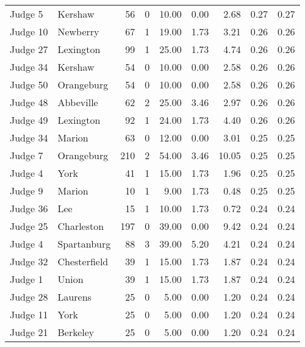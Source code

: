 \begin{tabular}{llrrrrrrr}
 Judge 5 &      Kershaw &    56 &      0 & 10.00 &       0.00 &      2.68 &         0.27 &      0.27 \\
Judge 10 &     Newberry &    67 &      1 & 19.00 &       1.73 &      3.21 &         0.26 &      0.26 \\
Judge 27 &    Lexington &    99 &      1 & 25.00 &       1.73 &      4.74 &         0.26 &      0.26 \\
Judge 34 &      Kershaw &    54 &      0 & 10.00 &       0.00 &      2.58 &         0.26 &      0.26 \\
Judge 50 &   Orangeburg &    54 &      0 & 10.00 &       0.00 &      2.58 &         0.26 &      0.26 \\
Judge 48 &    Abbeville &    62 &      2 & 25.00 &       3.46 &      2.97 &         0.26 &      0.26 \\
Judge 49 &    Lexington &    92 &      1 & 24.00 &       1.73 &      4.40 &         0.26 &      0.26 \\
Judge 34 &       Marion &    63 &      0 & 12.00 &       0.00 &      3.01 &         0.25 &      0.25 \\
 Judge 7 &   Orangeburg &   210 &      2 & 54.00 &       3.46 &     10.05 &         0.25 &      0.25 \\
 Judge 4 &         York &    41 &      1 & 15.00 &       1.73 &      1.96 &         0.25 &      0.25 \\
 Judge 9 &       Marion &    10 &      1 &  9.00 &       1.73 &      0.48 &         0.25 &      0.25 \\
Judge 36 &          Lee &    15 &      1 & 10.00 &       1.73 &      0.72 &         0.24 &      0.24 \\
Judge 25 &   Charleston &   197 &      0 & 39.00 &       0.00 &      9.42 &         0.24 &      0.24 \\
 Judge 4 &  Spartanburg &    88 &      3 & 39.00 &       5.20 &      4.21 &         0.24 &      0.24 \\
Judge 32 & Chesterfield &    39 &      1 & 15.00 &       1.73 &      1.87 &         0.24 &      0.24 \\
 Judge 1 &        Union &    39 &      1 & 15.00 &       1.73 &      1.87 &         0.24 &      0.24 \\
Judge 28 &      Laurens &    25 &      0 &  5.00 &       0.00 &      1.20 &         0.24 &      0.24 \\
Judge 11 &         York &    25 &      0 &  5.00 &       0.00 &      1.20 &         0.24 &      0.24 \\
Judge 21 &     Berkeley &    25 &      0 &  5.00 &       0.00 &      1.20 &         0.24 &      0.24 \\

\end{tabular}
